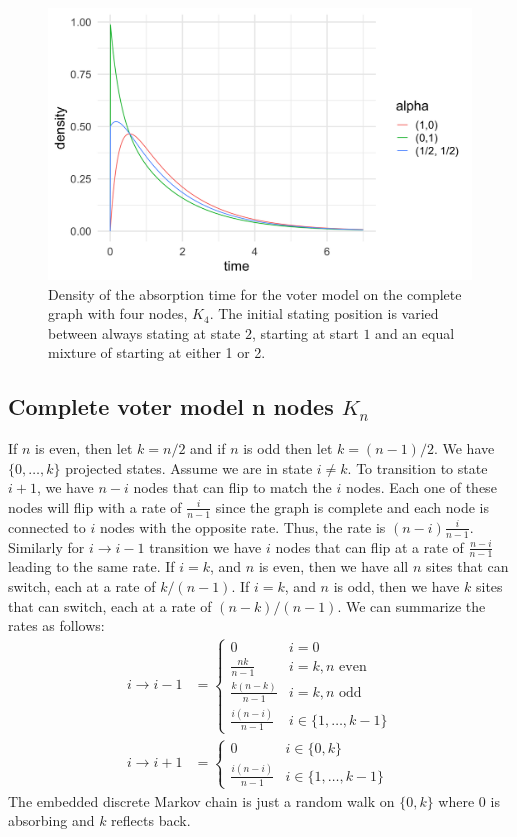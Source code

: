 \begin{figure}[H]
  \centering
    \includegraphics[width=.80\textwidth]{figures/voter_density_c4.png}
   \caption{Density of the absorption time for the voter model on the complete graph with four nodes, $K_4$. The initial stating position is varied between always stating at state $2$, starting at start $1$ and an equal mixture of starting at either 1 or 2.}
  \label{fig:voter_density_c4}
\end{figure}

\subsection{Complete voter model n nodes  \texorpdfstring{$K_n$}{VKn}}
If $n$ is even, then let $k = n / 2$ and if $n$ is odd then let $k = (n - 1)/2$.
We have $\{0,\ldots, k\}$ projected states.
Assume we are in state $i \not = k$.
To transition to state $i + 1$, we have $n - i$ nodes that can flip to match the $i$ nodes.
Each one of these nodes will flip with a rate of $\frac{i}{n - 1}$ since the graph is complete and each node is connected to $i$ nodes with the opposite rate.
Thus, the rate is $(n - i) \frac{i}{n - 1}$.
Similarly for $i \to i - 1$ transition we have $i$ nodes that can flip at a rate of $\frac{n - i}{n - 1}$ leading to the same rate.
If $i = k$, and $n$ is even, then we have all $n$ sites that can switch, each at a rate of $k / (n - 1)$.
If $i = k$, and $n$ is odd, then we have $k$ sites that can switch, each at a rate of $(n - k ) / (n - 1)$.
We can summarize the rates as follows:
\begin{align*}
    i \to i - 1 &= \begin{cases}
        0 & i = 0\\
        \frac{nk}{n - 1}  & i = k, n \text{ even}\\
        \frac{k (n - k)}{n - 1} & i = k, n \text{ odd}\\
        \frac{i (n - i)}{n - 1}  & i \in \{1,\ldots, k - 1\}
    \end{cases}\\
    i \to i + 1 &= \begin{cases}
        0 & i \in \{0, k\}\\
        \frac{i (n - i)}{n - 1}  & i \in \{1,\ldots, k - 1\}
    \end{cases}
\end{align*}
The embedded discrete Markov chain is just a random walk on $\{0, k\}$ where 0 is absorbing and $k$ reflects back.

